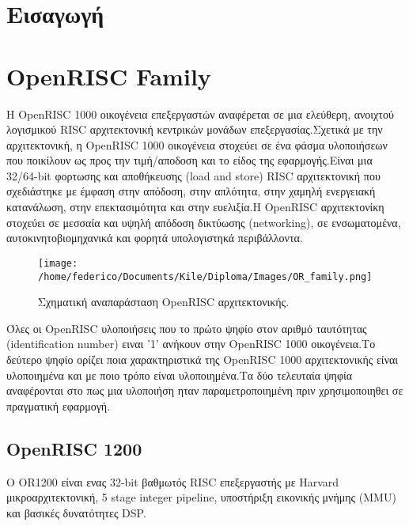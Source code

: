 \documentclass[a4paper,10pt]{article}
\begin{document}

\newpage
\tableofcontents
\newpage
\listoffigures
\newpage

\section{Εισαγωγή}
{
}

\section{OpenRISC Family}
{Η OpenRISC 1000 οικογένεια επεξεργαστών αναφέρεται σε μια ελεύθερη, ανοιχτού
λογισμικού RISC αρχιτεκτονική κεντρικών μονάδων επεξεργασίας.Σχετικά με την
αρχιτεκτονική, η OpenRISC 1000 οικογένεια στοχεύει σε ένα φάσμα υλοποιήσεων που	
ποικίλουν ως προς την τιμή/αποδοση και το είδος της εφαρμογής.Είναι μια 
32/64-bit φορτωσης και αποθήκευσης (load and store) RISC αρχιτεκτονική που σχεδιάστηκε
με έμφαση στην απόδοση, στην απλότητα, στην χαμηλή ενεργειακή κατανάλωση, στην επεκτασιμότητα
και στην ευελιξία.Η OpenRISC αρχιτεκτονίκη στοχεύει σε μεσσαία και υψηλή απόδοση
δικτύωσης (networking), σε ενσωματομένα, αυτοκινητοβιομηχανικά και φορητά υπολογιστηκά περιβάλλοντα.

\vspace{0.7cm}
\begin{figure}[h!]
 \centering
 \texttt{[image: /home/federico/Documents/Kile/Diploma/Images/OR\_family.png]}
 \caption{Σχηματική αναπαράσταση OpenRISC αρχιτεκτονικής.}
\end{figure}
\vspace{0.7cm}


Όλες οι OpenRISC υλοποιήσεις που το πρώτο ψηφίο στον αριθμό ταυτότητας
(identification number) ειναι '1' ανήκουν στην 
OpenRISC 1000 οικογένεια.Το δεύτερο ψηφίο ορίζει ποια χαρακτηριστικά της OpenRISC
1000 αρχιτεκτονικής είναι υλοποιημένα και με ποιο τρόπο είναι υλοποιημένα.Τα δύο
τελευταία ψηφία αναφέρονται στο πως μια υλοποιήση ηταν παραμετροποιημένη πριν 
χρησιμοποιηθει σε πραγματική εφαρμογή.
\subsection{OpenRISC 1200}
{ Ο OR1200 είναι ενας 32-bit βαθμωτός RISC επεξεργαστής με Harvard μικροαρχιτεκτονική,
5 stage integer pipeline, υποστήριξη εικονικής μνήμης (MMU) και βασικές δυνατότητες
DSP.

}}
\end{document}
